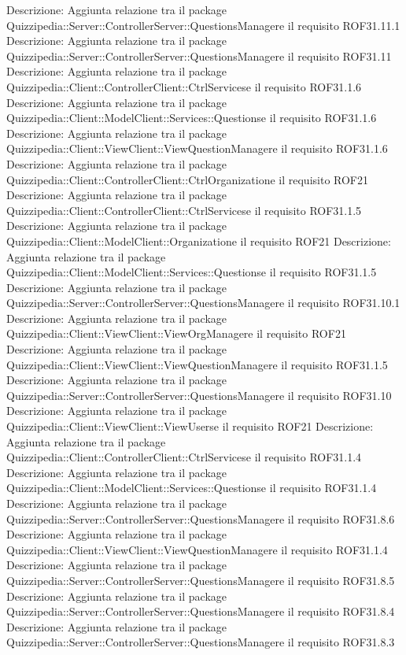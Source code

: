Descrizione: Aggiunta relazione tra il package Quizzipedia::Server::ControllerServer::QuestionsManagere il requisito ROF31.11.1 
Descrizione: Aggiunta relazione tra il package Quizzipedia::Server::ControllerServer::QuestionsManagere il requisito ROF31.11 
Descrizione: Aggiunta relazione tra il package Quizzipedia::Client::ControllerClient::CtrlServicese il requisito ROF31.1.6 
Descrizione: Aggiunta relazione tra il package Quizzipedia::Client::ModelClient::Services::Questionse il requisito ROF31.1.6 
Descrizione: Aggiunta relazione tra il package Quizzipedia::Client::ViewClient::ViewQuestionManagere il requisito ROF31.1.6 
Descrizione: Aggiunta relazione tra il package Quizzipedia::Client::ControllerClient::CtrlOrganizatione il requisito ROF21 
Descrizione: Aggiunta relazione tra il package Quizzipedia::Client::ControllerClient::CtrlServicese il requisito ROF31.1.5 
Descrizione: Aggiunta relazione tra il package Quizzipedia::Client::ModelClient::Organizatione il requisito ROF21 
Descrizione: Aggiunta relazione tra il package Quizzipedia::Client::ModelClient::Services::Questionse il requisito ROF31.1.5 
Descrizione: Aggiunta relazione tra il package Quizzipedia::Server::ControllerServer::QuestionsManagere il requisito ROF31.10.1 
Descrizione: Aggiunta relazione tra il package Quizzipedia::Client::ViewClient::ViewOrgManagere il requisito ROF21 
Descrizione: Aggiunta relazione tra il package Quizzipedia::Client::ViewClient::ViewQuestionManagere il requisito ROF31.1.5 
Descrizione: Aggiunta relazione tra il package Quizzipedia::Server::ControllerServer::QuestionsManagere il requisito ROF31.10 
Descrizione: Aggiunta relazione tra il package Quizzipedia::Client::ViewClient::ViewUserse il requisito ROF21 
Descrizione: Aggiunta relazione tra il package Quizzipedia::Client::ControllerClient::CtrlServicese il requisito ROF31.1.4 
Descrizione: Aggiunta relazione tra il package Quizzipedia::Client::ModelClient::Services::Questionse il requisito ROF31.1.4 
Descrizione: Aggiunta relazione tra il package Quizzipedia::Server::ControllerServer::QuestionsManagere il requisito ROF31.8.6 
Descrizione: Aggiunta relazione tra il package Quizzipedia::Client::ViewClient::ViewQuestionManagere il requisito ROF31.1.4 
Descrizione: Aggiunta relazione tra il package Quizzipedia::Server::ControllerServer::QuestionsManagere il requisito ROF31.8.5 
Descrizione: Aggiunta relazione tra il package Quizzipedia::Server::ControllerServer::QuestionsManagere il requisito ROF31.8.4 
Descrizione: Aggiunta relazione tra il package Quizzipedia::Server::ControllerServer::QuestionsManagere il requisito ROF31.8.3 
